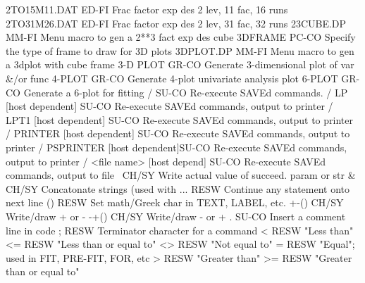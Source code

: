 2TO15M11.DAT                ED-FI Frac factor exp des 2 lev, 11 fac,  16 runs
2TO31M26.DAT                ED-FI Frac factor exp des 2 lev, 31 fac,  32 runs
23CUBE.DP                   MM-FI Menu macro to gen a 2**3 fact exp des cube
3DFRAME                     PC-CO Specify the type of frame to draw for 3D plots
3DPLOT.DP                   MM-FI Menu macro to gen a 3dplot with cube frame
3-D PLOT                    GR-CO Generate 3-dimensional plot of var &/or func
4-PLOT                      GR-CO Generate 4-plot univariate analysis plot
6-PLOT                      GR-CO Generate a 6-plot for fitting
/                           SU-CO Re-execute SAVEd commands.
/ LP [host dependent]       SU-CO Re-execute SAVEd commands, output to printer
/ LPT1 [host dependent]     SU-CO Re-execute SAVEd commands, output to printer
/ PRINTER [host dependent]  SU-CO Re-execute SAVEd commands, output to printer
/ PSPRINTER [host dependent]SU-CO Re-execute SAVEd commands, output to printer
/ <file name> [host depend] SU-CO Re-execute SAVEd commands, output to file
\                           CH/SY Write actual value of succeed. param or str
&                           CH/SY Concatonate strings (used with \)
...                         RESW  Continue any statement onto next line
()                          RESW  Set math/Greek char in TEXT, LABEL, etc.
+-()                        CH/SY Write/draw + or -
-+()                        CH/SY Write/draw - or +
.                           SU-CO Insert a comment line in code
;                           RESW  Terminator character for a command
<                           RESW  "Less than"
<=                          RESW  "Less than or equal to"
<>                          RESW  "Not equal to"
=                           RESW  "Equal"; used in FIT, PRE-FIT, FOR, etc
>                           RESW  "Greater than"
>=                          RESW  "Greater than or equal to"

